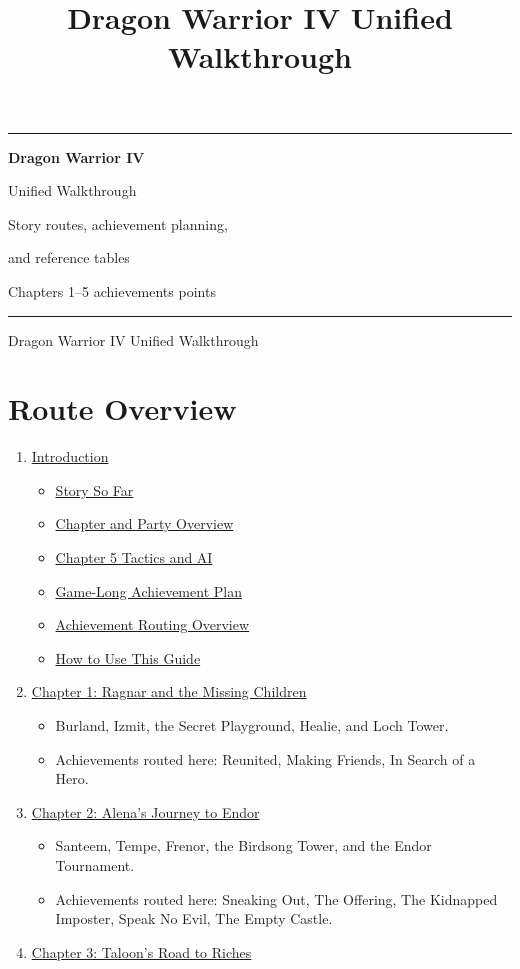 \documentclass[
  american,
  10pt,
  letterpaper,
  oneside,
  open=any]{scrreprt}
\title{Dragon Warrior IV Unified Walkthrough}
\author{}
\date{}
\providecommand{\tightlist}{%
  \setlength{\itemsep}{0pt}\setlength{\parskip}{0pt}}
\let\GuideOriginalContents\tableofcontents
\renewcommand{\tableofcontents}{%
  \clearpage\phantomsection\label{table-of-contents}%
  \GuideOriginalContents\clearpage
}
\renewcommand{\maketitle}{%
  \begin{titlepage}
  \thispagestyle{empty}\sffamily
  \setlength{\parfillskip}{0pt plus 1fil}
  \noindent{\small\textcolor{GuideGreen}{NINTENDO ENTERTAINMENT SYSTEM}}\par
  \vspace*{0.95in}
  \noindent\textcolor{GuideGreen}{\rule{\textwidth}{1.6pt}}\par
  \vspace{0.25in}
  {\fontsize{35}{41}\selectfont\bfseries\color{GuideGreen}Dragon Warrior IV\par}
  \vspace{0.15in}
  {\fontsize{23}{29}\selectfont Unified Walkthrough\par}
  \vspace{0.45in}
  {\large Story routes, achievement planning,\par and reference tables\par}
  \vspace{0.35in}
  {\normalsize Chapters 1--5\quad\textbullet\quad 43 achievements\quad\textbullet\quad 360 points\par}
  \vfill
  \noindent\textcolor{GuideGold}{\rule{\textwidth}{0.8pt}}\par
  \vspace{0.12in}
  {\footnotesize Dragon Warrior IV Unified Walkthrough\par}
  \end{titlepage}
  \pagenumbering{roman}
}
\begin{document}
\maketitle

{
\setcounter{tocdepth}{1}
\tableofcontents
}
\chapter{Route Overview}\label{route-overview}

\begin{enumerate}
\def\labelenumi{\arabic{enumi}.}
\tightlist
\item
  \hyperref[introduction]{Introduction}

  \begin{itemize}
  \tightlist
  \item
    \hyperref[story-so-far]{Story So Far}
  \item
    \hyperref[chapter-and-party-overview]{Chapter and Party Overview}
  \item
    \hyperref[chapter-5-tactics-and-ai]{Chapter 5 Tactics and AI}
  \item
    \hyperref[game-long-achievement-plan]{Game-Long Achievement Plan}
  \item
    \hyperref[achievement-routing-overview]{Achievement Routing
    Overview}
  \item
    \hyperref[how-to-use-this-guide]{How to Use This Guide}
  \end{itemize}
\item
  \hyperref[chapter-1-ragnar-and-the-missing-children]{Chapter 1: Ragnar
  and the Missing Children}

  \begin{itemize}
  \tightlist
  \item
    Burland, Izmit, the Secret Playground, Healie, and Loch Tower.
  \item
    Achievements routed here: Reunited, Making Friends, In Search of a
    Hero.
  \end{itemize}
\item
  \hyperref[chapter-2-alenas-journey-to-endor]{Chapter 2: Alena's
  Journey to Endor}

  \begin{itemize}
  \tightlist
  \item
    Santeem, Tempe, Frenor, the Birdsong Tower, and the Endor
    Tournament.
  \item
    Achievements routed here: Sneaking Out, The Offering, The Kidnapped
    Imposter, Speak No Evil, The Empty Castle.
  \end{itemize}
\item
  \hyperref[chapter-3-taloons-road-to-riches]{Chapter 3: Taloon's Road
  to Riches}


\end{enumerate}
\end{document}
